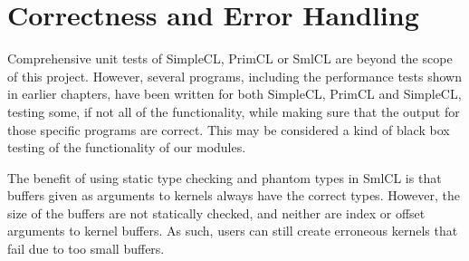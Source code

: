 \section{Correctness and Error Handling}
\label{sec:correct}

Comprehensive unit tests of SimpleCL, PrimCL or SmlCL are beyond the
scope of this project. However, several programs, including the
performance tests shown in earlier chapters, have been written for
both SimpleCL, PrimCL and SimpleCL, testing some, if not all of the
functionality, while making sure that the output for those specific
programs are correct. This may be considered a kind of black box
testing of the functionality of our modules.

The benefit of using static type checking and phantom types in SmlCL
is that buffers given as arguments to kernels always have the correct
types. However, the size of the buffers are not statically checked,
and neither are index or offset arguments to kernel buffers. As such,
users can still create erroneous kernels that fail due to too small
buffers. 
